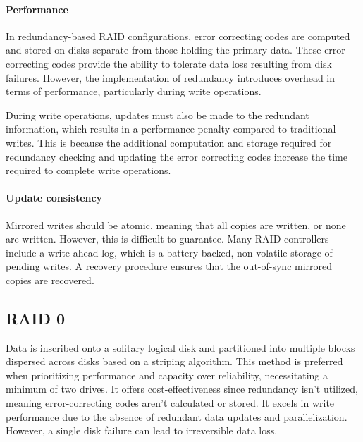 \paragraph*{Performance}
In redundancy-based RAID configurations, error correcting codes are computed and stored on disks separate from those holding the primary data. 
These error correcting codes provide the ability to tolerate data loss resulting from disk failures. 
However, the implementation of redundancy introduces overhead in terms of performance, particularly during write operations.

During write operations, updates must also be made to the redundant information, which results in a performance penalty compared to traditional writes. 
This is because the additional computation and storage required for redundancy checking and updating the error correcting codes increase the time required to complete write operations.

\paragraph*{Update consistency}
Mirrored writes should be atomic, meaning that all copies are written, or none are written.
However, this is difficult to guarantee.
Many RAID controllers include a write-ahead log, which is a battery-backed, non-volatile storage of pending writes. 
A recovery procedure ensures that the out-of-sync mirrored copies are recovered.













\subsection{RAID 0}

Data is inscribed onto a solitary logical disk and partitioned into multiple blocks dispersed across disks based on a striping algorithm. 
This method is preferred when prioritizing performance and capacity over reliability, necessitating a minimum of two drives. 
It offers cost-effectiveness since redundancy isn't utilized, meaning error-correcting codes aren't calculated or stored. 
It excels in write performance due to the absence of redundant data updates and parallelization.
However, a single disk failure can lead to irreversible data loss.

